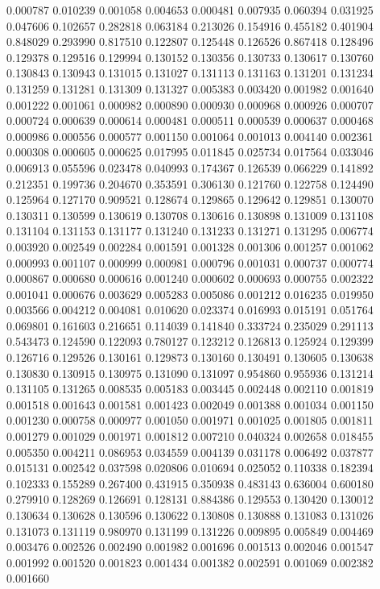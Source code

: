0.000787
0.010239
0.001058
0.004653
0.000481
0.007935
0.060394
0.031925
0.047606
0.102657
0.282818
0.063184
0.213026
0.154916
0.455182
0.401904
0.848029
0.293990
0.817510
0.122807
0.125448
0.126526
0.867418
0.128496
0.129378
0.129516
0.129994
0.130152
0.130356
0.130733
0.130617
0.130760
0.130843
0.130943
0.131015
0.131027
0.131113
0.131163
0.131201
0.131234
0.131259
0.131281
0.131309
0.131327
0.005383
0.003420
0.001982
0.001640
0.001222
0.001061
0.000982
0.000890
0.000930
0.000968
0.000926
0.000707
0.000724
0.000639
0.000614
0.000481
0.000511
0.000539
0.000637
0.000468
0.000986
0.000556
0.000577
0.001150
0.001064
0.001013
0.004140
0.002361
0.000308
0.000605
0.000625
0.017995
0.011845
0.025734
0.017564
0.033046
0.006913
0.055596
0.023478
0.040993
0.174367
0.126539
0.066229
0.141892
0.212351
0.199736
0.204670
0.353591
0.306130
0.121760
0.122758
0.124490
0.125964
0.127170
0.909521
0.128674
0.129865
0.129642
0.129851
0.130070
0.130311
0.130599
0.130619
0.130708
0.130616
0.130898
0.131009
0.131108
0.131104
0.131153
0.131177
0.131240
0.131233
0.131271
0.131295
0.006774
0.003920
0.002549
0.002284
0.001591
0.001328
0.001306
0.001257
0.001062
0.000993
0.001107
0.000999
0.000981
0.000796
0.001031
0.000737
0.000774
0.000867
0.000680
0.000616
0.001240
0.000602
0.000693
0.000755
0.002322
0.001041
0.000676
0.003629
0.005283
0.005086
0.001212
0.016235
0.019950
0.003566
0.004212
0.004081
0.010620
0.023374
0.016993
0.015191
0.051764
0.069801
0.161603
0.216651
0.114039
0.141840
0.333724
0.235029
0.291113
0.543473
0.124590
0.122093
0.780127
0.123212
0.126813
0.125924
0.129399
0.126716
0.129526
0.130161
0.129873
0.130160
0.130491
0.130605
0.130638
0.130830
0.130915
0.130975
0.131090
0.131097
0.954860
0.955936
0.131214
0.131105
0.131265
0.008535
0.005183
0.003445
0.002448
0.002110
0.001819
0.001518
0.001643
0.001581
0.001423
0.002049
0.001388
0.001034
0.001150
0.001230
0.000758
0.000977
0.001050
0.001971
0.001025
0.001805
0.001811
0.001279
0.001029
0.001971
0.001812
0.007210
0.040324
0.002658
0.018455
0.005350
0.004211
0.086953
0.034559
0.004139
0.031178
0.006492
0.037877
0.015131
0.002542
0.037598
0.020806
0.010694
0.025052
0.110338
0.182394
0.102333
0.155289
0.267400
0.431915
0.350938
0.483143
0.636004
0.600180
0.279910
0.128269
0.126691
0.128131
0.884386
0.129553
0.130420
0.130012
0.130634
0.130628
0.130596
0.130622
0.130808
0.130888
0.131083
0.131026
0.131073
0.131119
0.980970
0.131199
0.131226
0.009895
0.005849
0.004469
0.003476
0.002526
0.002490
0.001982
0.001696
0.001513
0.002046
0.001547
0.001992
0.001520
0.001823
0.001434
0.001382
0.002591
0.001069
0.002382
0.001660
